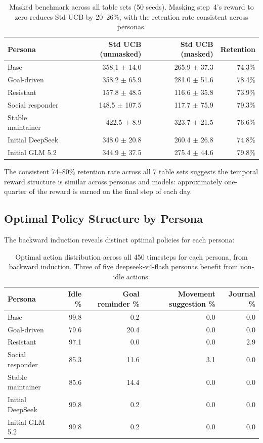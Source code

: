 \documentclass[11pt]{article}
\begin{document}
\begin{table}[h]
\centering
\begin{tabular}{lrrr}
\toprule
Persona & Std UCB (unmasked) & Std UCB (masked) & Retention \\
\midrule
Base & 358.1 $\pm$ 14.0 & 265.9 $\pm$ 37.3 & 74.3\% \\
Goal-driven & 358.2 $\pm$ 65.9 & 281.0 $\pm$ 51.6 & 78.4\% \\
Resistant & 157.8 $\pm$ 48.5 & 116.6 $\pm$ 35.8 & 73.9\% \\
Social responder & 148.5 $\pm$ 107.5 & 117.7 $\pm$ 75.9 & 79.3\% \\
Stable maintainer & 422.5 $\pm$ 8.9 & 323.7 $\pm$ 21.5 & 76.6\% \\
Initial DeepSeek & 348.0 $\pm$ 20.8 & 260.4 $\pm$ 26.8 & 74.8\% \\
Initial GLM 5.2 & 344.9 $\pm$ 37.5 & 275.4 $\pm$ 44.6 & 79.8\% \\
\bottomrule
\end{tabular}
\caption{Masked benchmark across all table sets (50 seeds). Masking step~4's reward to zero reduces Std UCB by 20--26\%, with the retention rate consistent across personas.}
\label{tab:cross_masked}
\end{table}

The consistent 74--80\% retention rate across all 7 table sets suggests the temporal reward structure is similar across personas and models: approximately one-quarter of the reward is earned on the final step of each day.

\subsection{Optimal Policy Structure by Persona}

The backward induction reveals distinct optimal policies for each persona:

\begin{table}[h]
\centering
\begin{tabular}{lrrrr}
\toprule
Persona & Idle \% & Goal reminder \% & Movement suggestion \% & Journal \% \\
\midrule
Base & 99.8 & 0.2 & 0.0 & 0.0 \\
Goal-driven & 79.6 & 20.4 & 0.0 & 0.0 \\
Resistant & 97.1 & 0.0 & 0.0 & 2.9 \\
Social responder & 85.3 & 11.6 & 3.1 & 0.0 \\
Stable maintainer & 85.6 & 14.4 & 0.0 & 0.0 \\
Initial DeepSeek & 99.8 & 0.2 & 0.0 & 0.0 \\
Initial GLM 5.2 & 99.8 & 0.2 & 0.0 & 0.0 \\
\bottomrule
\end{tabular}
\caption{Optimal action distribution across all 450 timesteps for each persona, from backward induction. Three of five deepseek-v4-flash personas benefit from non-idle actions.}
\label{tab:optimal_policies}
\end{table}
\end{document}
